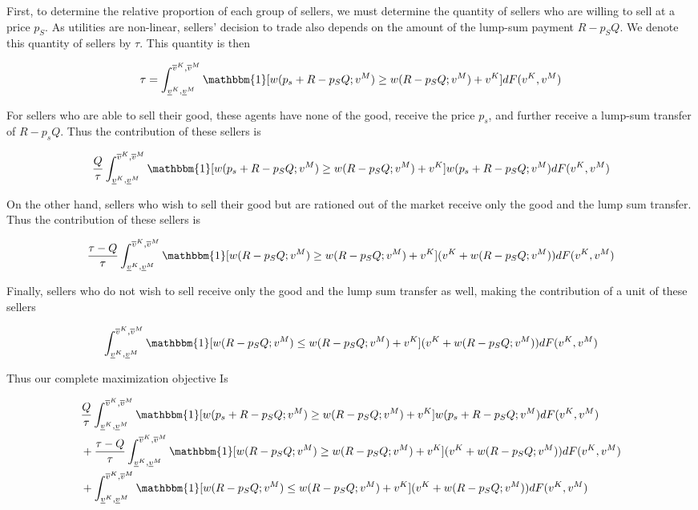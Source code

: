 \documentclass[AER]{AEA}
\begin{document}
First, to determine the relative proportion of each group of sellers, we must determine the quantity of sellers who are willing to sell at a price $p_S$. As utilities are non-linear, sellers' decision to trade also depends on the amount of the lump-sum payment $R - p_S Q$. We denote this quantity of sellers by $\tau$. This quantity is then

$$
\tau = \int_{\underline{v}^K, \underline{v}^M}^{\overline{v}^K, \overline{v}^M} \mathbbm{1}[w(p_s + R - p_SQ; v^M) \ge w(R - p_S Q ; v^M) + v^K] dF(v^K, v^M)
$$

For sellers who are able to sell their good, these agents have none of the good, receive the price $p_s$, and further receive a lump-sum transfer of $R - p_s Q$. Thus the contribution of these sellers is

\begin{equation}
    \frac{Q}{\tau} \int_{\underline{v}^K, \underline{v}^M}^{\overline{v}^K, \overline{v}^M} \mathbbm{1}[w(p_s + R - p_SQ; v^M) \ge w(R - p_S Q ; v^M) + v^K] w(p_s + R - p_SQ; v^M) dF(v^K, v^M)
\end{equation}


On the other hand, sellers who wish to sell their good but are rationed out of the market receive only the good and the lump sum transfer. Thus the contribution of these sellers is

\begin{equation}
    \frac{\tau - Q}{\tau} \int_{\underline{v}^K, \underline{v}^M}^{\overline{v}^K, \overline{v}^M} \mathbbm{1}[w(R - p_SQ; v^M) \ge w(R - p_S Q ; v^M) + v^K] (v^K + w(R - p_SQ; v^M)) dF(v^K, v^M)
\end{equation}

Finally, sellers who do not wish to sell receive only the good and the lump sum transfer as well, making the contribution of a unit of these sellers

\begin{equation}
    \int_{\underline{v}^K, \underline{v}^M}^{\overline{v}^K, \overline{v}^M} \mathbbm{1}[w(R - p_SQ; v^M) \le w(R - p_S Q ; v^M) + v^K] (v^K + w(R - p_SQ; v^M)) dF(v^K, v^M)
\end{equation}

Thus our complete maximization objective Is

\begin{equation}
    \begin{split}
        & \frac{Q}{\tau} \int_{\underline{v}^K, \underline{v}^M}^{\overline{v}^K, \overline{v}^M} \mathbbm{1}[w(p_s + R - p_SQ; v^M) \ge w(R - p_S Q ; v^M) + v^K] w(p_s + R - p_SQ; v^M) dF(v^K, v^M) \\
        & + \frac{\tau - Q}{\tau} \int_{\underline{v}^K, \underline{v}^M}^{\overline{v}^K, \overline{v}^M} \mathbbm{1}[w(R - p_SQ; v^M) \ge w(R - p_S Q ; v^M) + v^K] (v^K + w(R - p_SQ; v^M)) dF(v^K, v^M) \\
        & + \int_{\underline{v}^K, \underline{v}^M}^{\overline{v}^K, \overline{v}^M} \mathbbm{1}[w(R - p_SQ; v^M) \le w(R - p_S Q ; v^M) + v^K] (v^K + w(R - p_SQ; v^M)) dF(v^K, v^M)
    \end{split}
\end{equation}
\end{document}
